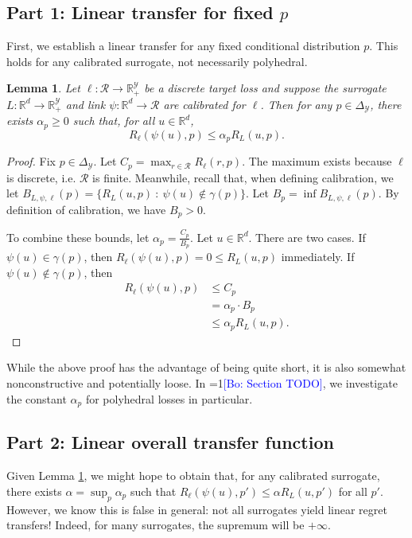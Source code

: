 \documentclass{article}
\newtheorem{lemma}{Lemma}
\theoremstyle{definition}\newtheorem{definition}{Definition}
\theoremstyle{definition}\newtheorem{assumption}{Assumption}
\newcommand{\Comments}{1}
\newcommand{\mynote}[2]{\ifnum\Comments=1\textcolor{#1}{#2}\fi}
\newcommand{\bo}[1]{\mynote{blue}{[Bo: #1]}}
\newcommand{\reals}{\mathbb{R}}
\newcommand{\simplex}{\Delta_\Y}
\newcommand{\R}{\mathcal{R}}
\newcommand{\Y}{\mathcal{Y}}
\begin{document}
\subsection{Part 1: Linear transfer for fixed $p$}
First, we establish a linear transfer for any fixed conditional distribution $p$.
This holds for any calibrated surrogate, not necessarily polyhedral.
\begin{lemma} \label{lemma:fixed-p}
  Let $\ell: \R \to \reals_+^{\Y}$ be a discrete target loss and suppose the surrogate $L: \reals^d \to \reals_+^{\Y}$ and link $\psi: \reals^d \to \R$ are calibrated for $\ell$.
  Then for any $p \in \simplex$, there exists $\alpha_p \geq 0$ such that, for all $u \in \reals^d$,
    \[ R_{\ell}(\psi(u),p) \leq \alpha_p R_L(u,p) . \]
\end{lemma}
\begin{proof}
  Fix $p \in \simplex$.
  Let $C_p = \max_{r \in \R} R_{\ell}(r,p)$.
  The maximum exists because $\ell$ is discrete, i.e. $\R$ is finite.
  Meanwhile, recall that, when defining calibration, we let $B_{L,\psi,\ell}(p) = \{R_L(u,p) ~:~ \psi(u) \not\in \gamma(p)\}$.
  Let $B_p = \inf B_{L,\psi,\ell}(p)$.
  By definition of calibration, we have $B_p > 0$.

  To combine these bounds, let $\alpha_p = \frac{C_p}{B_p}$.
  Let $u \in \reals^d$.
  There are two cases.
  If $\psi(u) \in \gamma(p)$, then $R_{\ell}(\psi(u),p) = 0 \leq R_L(u,p)$ immediately.
  If $\psi(u) \not\in \gamma(p)$, then
  \begin{align*}
    R_{\ell}(\psi(u),p)
    &\leq C_p \\
    &=    \alpha_p \cdot B_p  \\
    &\leq \alpha_p R_L(u,p) .
  \end{align*}
\end{proof}
While the above proof has the advantage of being quite short, it is also somewhat nonconstructive and potentially loose.
In \bo{Section TODO}, we investigate the constant $\alpha_p$ for polyhedral losses in particular.

\subsection{Part 2: Linear overall transfer function}
Given Lemma \ref{lemma:fixed-p}, we might hope to obtain that, for any calibrated surrogate, there exists $\alpha = \sup_p \alpha_p$ such that $R_{\ell}(\psi(u),p') \leq \alpha R_L(u,p')$ for all $p'$.
However, we know this is false in general: not all surrogates yield linear regret transfers!
Indeed, for many surrogates, the supremum will be $+\infty$.
\end{document}
